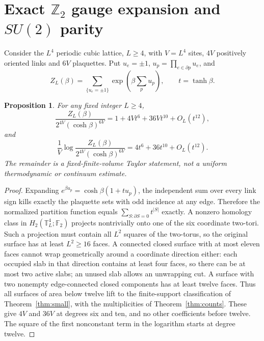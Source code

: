 \documentclass[11pt,a4paper]{article}
\newtheorem{proposition}{Proposition}
\begin{document}
\section{Exact \(\mathbb Z_2\) gauge expansion and \(SU(2)\) parity}
Consider the \(L^4\) periodic cubic lattice, \(L\ge4\), with \(V=L^4\) sites, \(4V\) positively oriented links and \(6V\) plaquettes. Put \(u_e=\pm1\), \(u_p=\prod_{e\in\partial p}u_e\), and
\[
Z_L(\beta)=\sum_{\{u_e=\pm1\}}\exp\!\left(\beta\sum_p u_p\right),
\qquad t=\tanh\beta.
\]
\begin{proposition}\label{prop:z}
For any fixed integer \(L\ge4\),
\[
\frac{Z_L(\beta)}{2^{4V}(\cosh\beta)^{6V}}
=1+4Vt^6+36Vt^{10}+O_L(t^{12}),
\]
and
\[
\frac1V\log\frac{Z_L(\beta)}
{2^{4V}(\cosh\beta)^{6V}}
=4t^6+36t^{10}+O_L(t^{12}).
\]
The remainder is a fixed-finite-volume Taylor statement, not a uniform thermodynamic or continuum estimate.
\end{proposition}
\begin{proof}
Expanding \(e^{\beta u_p}=\cosh\beta(1+tu_p)\), the independent sum over every link sign kills exactly the plaquette sets with odd incidence at any edge. Therefore the normalized partition function equals \(\sum_{S:\partial S=0}t^{|S|}\) exactly. A nonzero homology class in \(H_2(\mathbb T_L^4;\mathbb F_2)\) projects nontrivially onto one of the six coordinate two-tori. Such a projection must contain all \(L^2\) squares of the two-torus, so the original surface has at least \(L^2\ge16\) faces. A connected closed surface with at most eleven faces cannot wrap geometrically around a coordinate direction either: each occupied slab in that direction contains at least four faces, so there can be at most two active slabs; an unused slab allows an unwrapping cut. A surface with two nonempty edge-connected closed components has at least twelve faces. Thus all surfaces of area below twelve lift to the finite-support classification of Theorem~\ref{thm:small}, with the multiplicities of Theorem~\ref{thm:counts}. These give \(4V\) and \(36V\) at degrees six and ten, and no other coefficients before twelve. The square of the first nonconstant term in the logarithm starts at degree twelve.
\end{proof}
\end{document}
